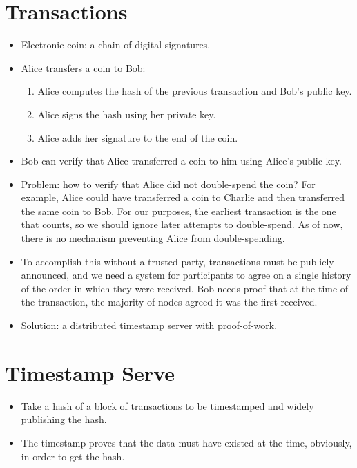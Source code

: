 \documentclass{article}
\begin{document}
\section{Transactions}

\begin{itemize}
  \item Electronic coin: a chain of digital signatures.
  \item Alice transfers a coin to Bob:
    \begin{enumerate}
      \item Alice computes the hash of the previous transaction and Bob's public
        key. %
      \item Alice signs the hash using her private key.
      \item Alice adds her signature to the end of the coin.
    \end{enumerate}
  \item Bob can verify that Alice transferred a coin to him using Alice's public
    key.
  \item Problem: how to verify that Alice did not double-spend the coin? For
    example, Alice could have transferred a coin to Charlie and then transferred
    the same coin to Bob. For our purposes, the earliest transaction is the one
    that counts, so we should ignore later attempts to double-spend. As of now,
    there is no mechanism preventing Alice from double-spending.
  \item To accomplish this without a trusted party, transactions must be
    publicly announced, and we need a system for participants to agree on a
    single history of the order in which they were received. Bob needs proof
    that at the time of the transaction, the majority of nodes agreed it was the
    first received.
  \item Solution: a distributed timestamp server with proof-of-work.
\end{itemize}

\section{Timestamp Serve}

\begin{itemize}
  \item Take a hash of a block of transactions to be timestamped and widely
    publishing the hash.
  \item The timestamp proves that the data must have existed at the time,
    obviously, in order to get the hash.
\end{itemize}
\end{document}
